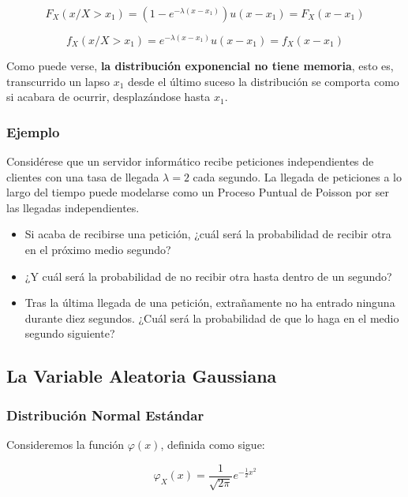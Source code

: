 \documentclass[11pt]{article}
\providecommand{\tightlist}{%
      \setlength{\itemsep}{0pt}\setlength{\parskip}{0pt}}
\begin{document}
\[
F_X(x/X>x_1) = \left( 1-e^{-\lambda (x-x_1)}\right)u(x-x_1) = F_X(x-x_1)
\]

\[
f_X(x/X>x_1) = e^{-\lambda (x-x_1)}u(x-x_1) = f_X(x-x_1)
\]

Como puede verse, \textbf{la distribución exponencial no tiene memoria},
esto es, transcurrido un lapso \(x_1\) desde el último suceso la
distribución se comporta como si acabara de ocurrir, desplazándose hasta
\(x_1\).

    \hypertarget{ejemplo}{%
\subsubsection*{Ejemplo}\label{ejemplo}}

Considérese que un servidor informático recibe peticiones independientes
de clientes con una tasa de llegada \(\lambda = 2\) cada segundo. La
llegada de peticiones a lo largo del tiempo puede modelarse como un
Proceso Puntual de Poisson por ser las llegadas independientes.

\begin{itemize}
\tightlist
\item
  Si acaba de recibirse una petición, ¿cuál será la probabilidad de
  recibir otra en el próximo medio segundo?
\item
  ¿Y cuál será la probabilidad de no recibir otra hasta dentro de un
  segundo?
\item
  Tras la última llegada de una petición, extrañamente no ha entrado
  ninguna durante diez segundos. ¿Cuál será la probabilidad de que lo
  haga en el medio segundo siguiente?
\end{itemize}

    \hypertarget{la-variable-aleatoria-gaussiana}{%
\subsection*{La Variable Aleatoria
Gaussiana}\label{la-variable-aleatoria-gaussiana}}

\hypertarget{distribuciuxf3n-normal-estuxe1ndar}{%
\subsubsection*{Distribución Normal
Estándar}\label{distribuciuxf3n-normal-estuxe1ndar}}

Consideremos la función \(\varphi(x)\), definida como sigue:

\[\varphi_X(x) = \frac{1}{\sqrt{2\pi}}e^{-\frac{1}{2}x^2}\]
\end{document}
